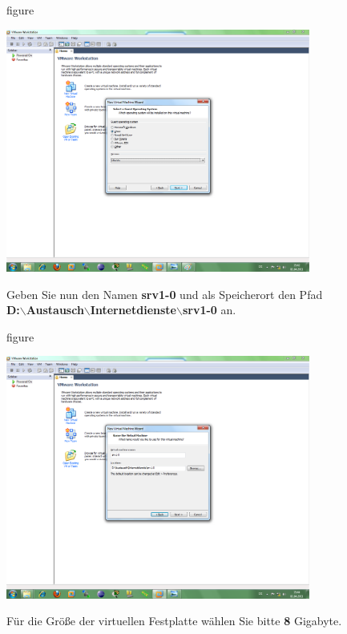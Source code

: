 \begin{nofloat}{figure}
\begin{center}
\includegraphics[width=0.75\textwidth]{screenshots/vm04.png}
\end{center}
\end{nofloat}

Geben Sie nun den Namen \textbf{srv1-0} und als Speicherort den Pfad \\
\textbf{D:$\backslash$Austausch$\backslash$Internetdienste$\backslash$srv1-0}
an.

\begin{nofloat}{figure}
\begin{center}
\includegraphics[width=0.75\textwidth]{screenshots/vm05.png}
\end{center}
\end{nofloat}

Für die Größe der virtuellen Festplatte wählen Sie bitte \textbf{8} Gigabyte.

